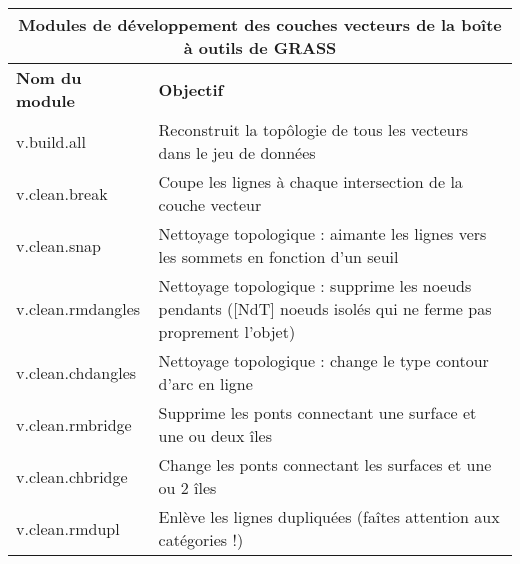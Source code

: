 {\footnotesize
\begin{table}[H]
\centering

 \begin{tabular}{|p{3cm}|p{11cm}|}
   \hline \multicolumn{2}{|c|}{\textbf{Modules de développement des couches vecteurs de la boîte à outils de GRASS}} \\
  \hline \textbf{Nom du module} & \textbf{Objectif} \\
  \hline v.build.all & Reconstruit la top\^ologie de tous les vecteurs dans le jeu de données\\
  \hline v.clean.break & Coupe les lignes à chaque intersection de la couche vecteur\\
  \hline v.clean.snap & Nettoyage topologique : aimante les lignes vers les sommets en fonction d'un seuil\\
  \hline v.clean.rmdangles & Nettoyage topologique : supprime les noeuds pendants ([NdT] noeuds isolés qui ne ferme pas proprement l'objet) \\
  \hline v.clean.chdangles & Nettoyage topologique : change le type contour d'arc en ligne \\
  \hline v.clean.rmbridge & Supprime les ponts connectant une surface et une ou deux îles\\
  \hline v.clean.chbridge & Change les ponts connectant les surfaces et une ou 2 îles \\
  \hline v.clean.rmdupl & Enlève les lignes dupliquées  (faîtes attention aux catégories !) \\

\end{tabular}
\end{table}}
